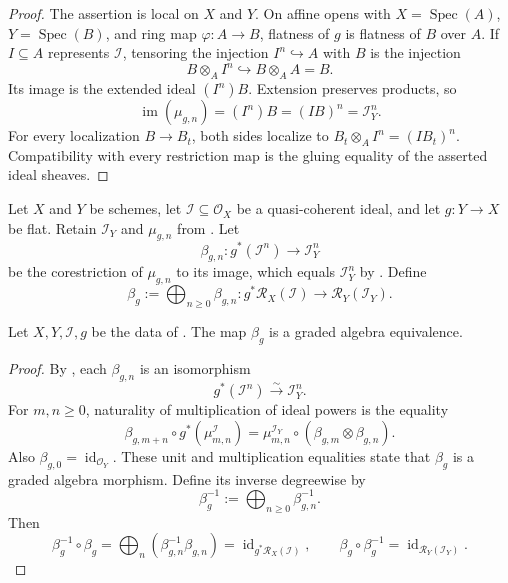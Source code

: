 \begin{proof}
  The assertion is local on $X$ and $Y$.  On affine opens with
  $X=\operatorname{Spec}(A)$, $Y=\operatorname{Spec}(B)$, and ring map
  $\varphi\colon A\to B$, flatness of $g$ is flatness of $B$ over $A$.
  If $I\subseteq A$ represents $\mathcal I$, tensoring the injection
  $I^n\hookrightarrow A$ with $B$ is the injection
  \[
    B\otimes_AI^n\hookrightarrow B\otimes_AA=B.
  \]
  Its image is the extended ideal $(I^n)B$.  Extension preserves products, so
  \[
    \operatorname{im}(\mu_{g,n})
      =(I^n)B=(IB)^n=\mathcal I_Y^n.
  \]
  For every localization $B\to B_t$, both sides localize to
  $B_t\otimes_AI^n=(IB_t)^n$.  Compatibility with every restriction map is
  the gluing equality of the asserted ideal sheaves.
\end{proof}

\begin{definition}
  \label{def:nagata-flat-pullback-rees-map}
  \lean{}

  Let $X$ and $Y$ be schemes, let
  $\mathcal I\subseteq\mathcal O_X$ be a quasi-coherent ideal, and let
  $g\colon Y\to X$ be flat.  Retain $\mathcal I_Y$ and $\mu_{g,n}$ from
  .  Let
  \[
    \beta_{g,n}\colon g^*(\mathcal I^n)\longrightarrow\mathcal I_Y^n
  \]
  be the corestriction of $\mu_{g,n}$ to its image, which equals
  $\mathcal I_Y^n$ by
  .  Define
  \[
    \beta_g:=\bigoplus_{n\ge0}\beta_{g,n}\colon
      g^*\mathcal R_X(\mathcal I)\longrightarrow
      \mathcal R_Y(\mathcal I_Y).
  \]
\end{definition}

\begin{lemma}
  \label{lemma:nagata-flat-pullback-rees}
  \lean{}

  Let $X,Y,\mathcal I,g$ be the data of
  .  The map $\beta_g$ is a graded
  algebra equivalence.
\end{lemma}

\begin{proof}
  By , each
  $\beta_{g,n}$ is an isomorphism
  \[
    g^*(\mathcal I^n)\xrightarrow{\sim}\mathcal I_Y^n.
  \]
  For $m,n\ge0$, naturality of multiplication of ideal powers is the
  equality
  \[
    \beta_{g,m+n}\circ g^*(\mu^{\mathcal I}_{m,n})
      =\mu^{\mathcal I_Y}_{m,n}\circ
        (\beta_{g,m}\otimes\beta_{g,n}).
  \]
  Also $\beta_{g,0}=\operatorname{id}_{\mathcal O_Y}$.  These unit and
  multiplication equalities state that $\beta_g$ is a graded algebra
  morphism.  Define its inverse degreewise by
  \[
    \beta_g^{-1}:=\bigoplus_{n\ge0}\beta_{g,n}^{-1}.
  \]
  Then
  \[
    \beta_g^{-1}\circ\beta_g
      =\bigoplus_n(\beta_{g,n}^{-1}\beta_{g,n})
      =\operatorname{id}_{g^*\mathcal R_X(\mathcal I)},
    \qquad
    \beta_g\circ\beta_g^{-1}
      =\operatorname{id}_{\mathcal R_Y(\mathcal I_Y)}.
  \]
\end{proof}


